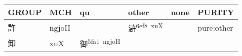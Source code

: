 \documentclass[14pt,a4paper]{scrartcl}
\begin{document}
\begin{longtable}[c]{@{}llllll@{}}
\toprule
\begin{minipage}[b]{0.14\columnwidth}\raggedright\strut
GROUP
\strut\end{minipage} &
\begin{minipage}[b]{0.14\columnwidth}\raggedright\strut
MCH
\strut\end{minipage} &
\begin{minipage}[b]{0.14\columnwidth}\raggedright\strut
qu
\strut\end{minipage} &
\begin{minipage}[b]{0.14\columnwidth}\raggedright\strut
other
\strut\end{minipage} &
\begin{minipage}[b]{0.14\columnwidth}\raggedright\strut
none
\strut\end{minipage} &
\begin{minipage}[b]{0.14\columnwidth}\raggedright\strut
PURITY
\strut\end{minipage}\tabularnewline
\midrule
\endhead
\begin{minipage}[t]{0.14\columnwidth}\raggedright\strut
許
\strut\end{minipage} &
\begin{minipage}[t]{0.14\columnwidth}\raggedright\strut
ngjoH
\strut\end{minipage} &
\begin{minipage}[t]{0.14\columnwidth}\raggedright\strut
\strut\end{minipage} &
\begin{minipage}[t]{0.14\columnwidth}\raggedright\strut
滸\textsuperscript{6ef8~xuX}
\strut\end{minipage} &
\begin{minipage}[t]{0.14\columnwidth}\raggedright\strut
\strut\end{minipage} &
\begin{minipage}[t]{0.14\columnwidth}\raggedright\strut
pure:other
\strut\end{minipage}\tabularnewline
\begin{minipage}[t]{0.14\columnwidth}\raggedright\strut
卸
\strut\end{minipage} &
\begin{minipage}[t]{0.14\columnwidth}\raggedright\strut
xuX
\strut\end{minipage} &
\begin{minipage}[t]{0.14\columnwidth}\raggedright\strut
御\textsuperscript{5fa1~ngjoH}
\strut\end{minipage} &

\end{longtable}
\end{document}
